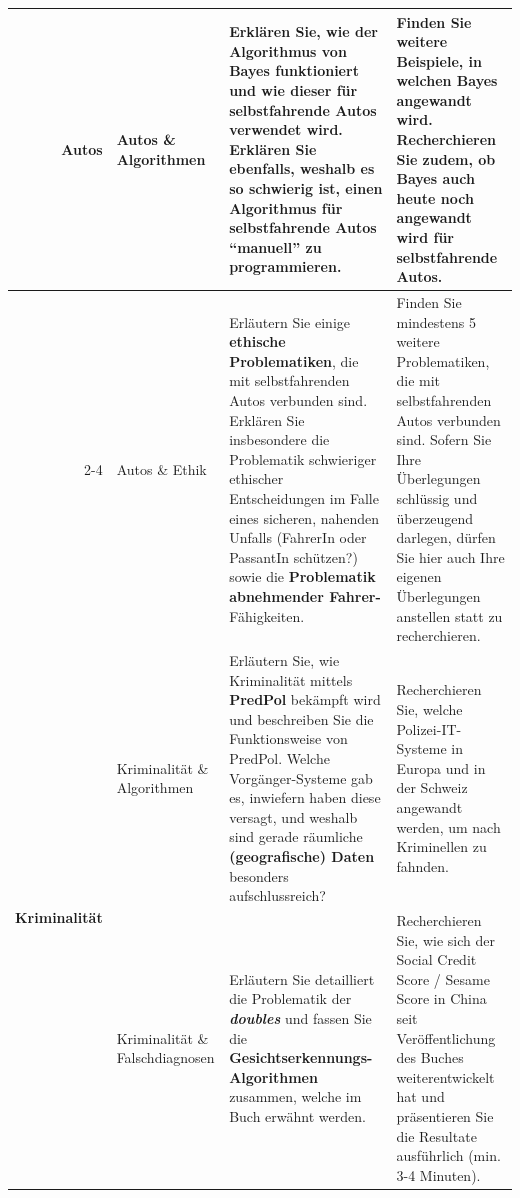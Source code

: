 \begin{landscape}
\begin{longtable}{@{}r|p{5.3cm}||p{10cm}|p{10cm}@{}}
		\multirow{2}{*}{\textbf{Autos}}        & Autos \& Algorithmen                  & Erklären Sie, wie der \textbf{Algorithmus von Bayes} funktioniert und wie dieser für selbstfahrende Autos verwendet wird. Erklären Sie ebenfalls, weshalb es so schwierig ist, einen Algorithmus für selbstfahrende Autos \enquote{manuell} zu programmieren.                                                                                                                              & Finden Sie weitere Beispiele, in welchen Bayes angewandt wird. Recherchieren Sie zudem, ob Bayes auch heute noch angewandt wird für selbstfahrende Autos.                                                                                                                        \\\cmidrule(l){2-4}
		                              & Autos \& Ethik                        & Erläutern Sie einige \textbf{ethische Problematiken}, die mit selbstfahrenden Autos verbunden sind. Erklären Sie insbesondere die Problematik schwieriger ethischer Entscheidungen im Falle eines sicheren, nahenden Unfalls (FahrerIn oder PassantIn schützen?) sowie die \textbf{Problematik abnehmender Fahrer-}Fähigkeiten.                                                               & Finden Sie mindestens 5 weitere Problematiken, die mit selbstfahrenden Autos verbunden sind. Sofern Sie Ihre Überlegungen schlüssig und überzeugend darlegen, dürfen Sie hier auch Ihre eigenen Überlegungen anstellen statt zu recherchieren.                                   \\\midrule\midrule
		\multirow{2}{*}{\textbf{Kriminalität}} & Kriminalität \& Algorithmen           & Erläutern Sie, wie Kriminalität mittels \textbf{PredPol} bekämpft wird und beschreiben Sie die Funktionsweise von PredPol. Welche Vorgänger-Systeme gab es, inwiefern haben diese versagt, und weshalb sind gerade räumliche \textbf{(geografische) Daten} besonders aufschlussreich?                                                                                                         & Recherchieren Sie, welche Polizei-IT-Systeme in Europa und in der Schweiz angewandt werden, um nach Kriminellen zu fahnden.                                                                                                                                                      \\\cmidrule(l){2-4}
		                              & Kriminalität \& Falschdiagnosen       & Erläutern Sie detailliert die Problematik der \textit{\textbf{doubles}} und fassen Sie die \textbf{Gesichtserkennungs-Algorithmen} zusammen, welche im Buch erwähnt werden.                                                                                                                                                                                                                            & Recherchieren Sie, wie sich der Social Credit Score / Sesame Score in China seit Veröffentlichung des Buches weiterentwickelt hat und präsentieren Sie die Resultate ausführlich (min. 3-4 Minuten).                                                                             \\\midrule\midrule

\end{longtable}
\end{landscape}
